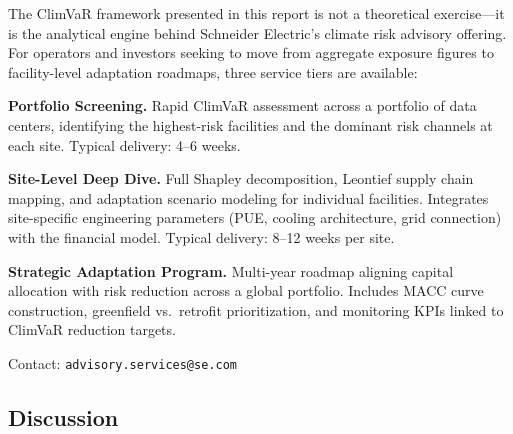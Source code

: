 \vspace{4mm}
\begin{tcolorbox}[colback=SEDarkGreen!5, colframe=SEGreen, title={\textcolor{SEGreen}{\textbf{From Analysis to Action: SE Advisory Services}}}, fonttitle=\sffamily\bfseries]
\small
The ClimVaR framework presented in this report is not a theoretical exercise---it is the analytical engine behind Schneider Electric's climate risk advisory offering. For operators and investors seeking to move from aggregate exposure figures to facility-level adaptation roadmaps, three service tiers are available:

\textbf{Portfolio Screening.} Rapid ClimVaR assessment across a portfolio of data centers, identifying the highest-risk facilities and the dominant risk channels at each site. Typical delivery: 4--6 weeks.

\textbf{Site-Level Deep Dive.} Full Shapley decomposition, Leontief supply chain mapping, and adaptation scenario modeling for individual facilities. Integrates site-specific engineering parameters (PUE, cooling architecture, grid connection) with the financial model. Typical delivery: 8--12 weeks per site.

\textbf{Strategic Adaptation Program.} Multi-year roadmap aligning capital allocation with risk reduction across a global portfolio. Includes MACC curve construction, greenfield vs.\ retrofit prioritization, and monitoring KPIs linked to ClimVaR reduction targets.

\vspace{1mm}
\noindent Contact: \texttt{advisory.services@se.com}
\end{tcolorbox}

\clearpage\thispagestyle{chapterstart}

\subsection*{Discussion}
\greensep

